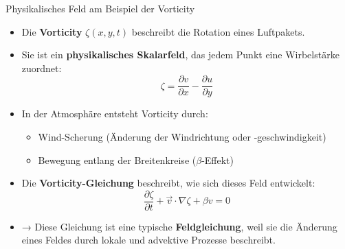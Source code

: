 \begin{frame}{Physikalisches Feld am Beispiel der Vorticity}
  \begin{itemize}
      \item Die \textbf{Vorticity} \( \zeta(x, y, t) \) beschreibt die Rotation eines Luftpakets.
      
      \item Sie ist ein \textbf{physikalisches Skalarfeld}, das jedem Punkt eine Wirbelstärke zuordnet:
      \[
          \zeta = \frac{\partial v}{\partial x} - \frac{\partial u}{\partial y}
      \]
      
      \item In der Atmosphäre entsteht Vorticity durch:
      \begin{itemize}
          \item Wind-Scherung (Änderung der Windrichtung oder -geschwindigkeit)
          \item Bewegung entlang der Breitenkreise (\( \beta \)-Effekt)
      \end{itemize}
      
      \item Die \textbf{Vorticity-Gleichung} beschreibt, wie sich dieses Feld entwickelt:
      \[
          \frac{\partial \zeta}{\partial t} + \vec{v} \cdot \nabla \zeta + \beta v = 0
      \]
      
      \item → Diese Gleichung ist eine typische \textbf{Feldgleichung}, weil sie die Änderung eines Feldes durch lokale und advektive Prozesse beschreibt.
  \end{itemize}
  \end{frame}
  